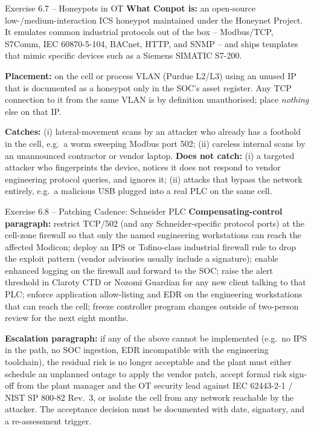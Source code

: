 \documentclass[11pt,a4paper]{article}
\begin{document}
\begin{taskbox}{Exercise 6.7 -- Honeypots in OT}
\textbf{What Conpot is:} an open-source low-/medium-interaction ICS
honeypot maintained under the Honeynet Project. It emulates common
industrial protocols out of the box -- Modbus/TCP, S7Comm, IEC
60870-5-104, BACnet, HTTP, and SNMP -- and ships templates that
mimic specific devices such as a Siemens SIMATIC S7-200.

\textbf{Placement:} on the cell or process VLAN (Purdue L2/L3) using
an unused IP that is documented as a honeypot only in the SOC's
asset register. Any TCP connection to it from the same VLAN is by
definition unauthorised; place \emph{nothing} else on that IP.

\textbf{Catches:} (i) lateral-movement scans by an attacker who
already has a foothold in the cell, e.g.\ a worm sweeping Modbus
port 502; (ii) careless internal scans by an unannounced contractor
or vendor laptop. \textbf{Does not catch:} (i) a targeted attacker
who fingerprints the device, notices it does not respond to vendor
engineering protocol queries, and ignores it; (ii) attacks that
bypass the network entirely, e.g.\ a malicious USB plugged into a
real PLC on the same cell.
\end{taskbox}

\begin{taskbox}{Exercise 6.8 -- Patching Cadence: Schneider PLC}
\textbf{Compensating-control paragraph:} restrict TCP/502 (and any
Schneider-specific protocol ports) at the cell-zone firewall so
that only the named engineering workstations can reach the affected
Modicon; deploy an IPS or Tofino-class industrial firewall rule to
drop the exploit pattern (vendor advisories usually include a
signature); enable enhanced logging on the firewall and forward to
the SOC; raise the alert threshold in Claroty CTD or Nozomi
Guardian for any new client talking to that PLC; enforce
application allow-listing and EDR on the engineering workstations
that can reach the cell; freeze controller program changes outside
of two-person review for the next eight months.

\textbf{Escalation paragraph:} if any of the above cannot be
implemented (e.g.\ no IPS in the path, no SOC ingestion, EDR
incompatible with the engineering toolchain), the residual risk is
no longer acceptable and the plant must either schedule an
unplanned outage to apply the vendor patch, accept formal risk
sign-off from the plant manager and the OT security lead against
IEC 62443-2-1 / NIST SP 800-82 Rev.~3, or isolate the cell from any
network reachable by the attacker. The acceptance decision must be
documented with date, signatory, and a re-assessment trigger.
\end{taskbox}
\end{document}
